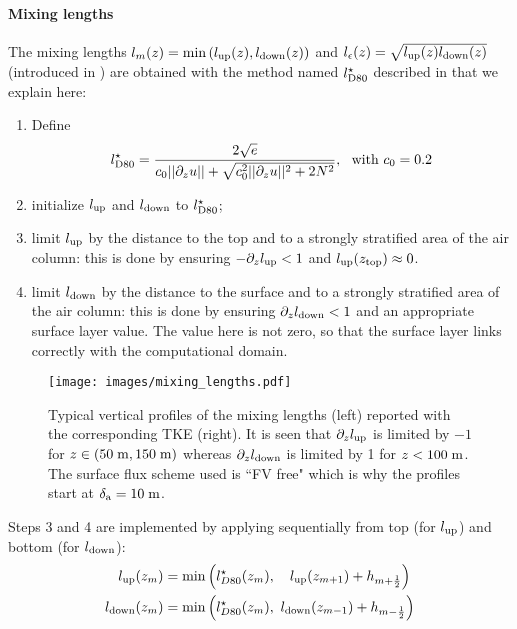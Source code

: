 \paragraph{Mixing lengths}
The mixing lengths $l_m(z) = \min{(l_{\rm up}(z), l_{\rm down}(z))}$
and $l_\epsilon(z) = \sqrt{l_{\rm up}(z) l_{\rm down}(z)}$
(introduced in \citep{bougeault_parameterization_1989})
are obtained with the method named $l^\star_{\rm D80}$ described in
\citep{lemarie_simplified_2021} that we explain here:
\begin{enumerate}
	\item Define
		\begin{equation}
			\label{eq:ND_StratifiedCase_lD80}
			l^\star_{\rm D80} = \frac{2\sqrt{e}}
			{c_0 ||\partial_z u|| + \sqrt{
				c_0^2 ||\partial_z u||^2 + 2 N^2
			}}, ~~ \text{with } c_0=0.2
		\end{equation}
	\item initialize $l_{\rm up}$ and $l_{\rm down}$ to
		$l^\star_{\rm D80}$;
	\item limit $l_{\rm up}$ by the distance to the top and to
		a strongly stratified area of the air column:
		this is done by ensuring $-\partial_z l_{\rm up} < 1$
		and $l_{\rm up}(z_{\rm top}) \approx 0$.
	\item limit $l_{\rm down}$ by the distance to the surface
		and to a strongly stratified area of the air column:
		this is done by ensuring $\partial_z l_{\rm down} < 1$
		and an appropriate surface layer value.
		The value here is not zero, so that the surface layer
		links correctly with the computational domain.
\end{enumerate}
\begin{figure}
	\centering
	\texttt{[image: images/mixing\_lengths.pdf]}
	\caption{Typical vertical profiles of the mixing lengths
	(left) reported with the corresponding TKE (right).
	It is seen that $\partial_z l_{\rm up}$ is limited by $-1$
	for $z\in (50 \; {\rm m}, 150\; {\rm m})$ whereas
	$\partial_z l_{\rm down}$ is limited by 1 for $z<100 \;{\rm m}$.
	The surface flux scheme used is ``FV free" which is why the
	profiles start at $\delta_{\rm a} = 10\;{\rm m}$.}
	\label{fig:ND_StratifiedCase_mixing_lengths}
\end{figure}
Steps 3 and 4 are implemented by applying sequentially from top
(for $l_{\rm up}$) and bottom (for $l_{\rm down}$):
\begin{equation}
	\begin{aligned}
		l_{\rm up}(z_m) &= \min\left(l^\star_{D80}(z_m),~~~
		l_{\rm up}(z_{m+1}) + h_{m+\frac{1}{2}}\right) \\
		l_{\rm down}(z_m) &= \min\left(l^\star_{D80}(z_m),~
		l_{\rm down}(z_{m-1}) + h_{m-\frac{1}{2}}\right)
	\end{aligned}
\end{equation}

